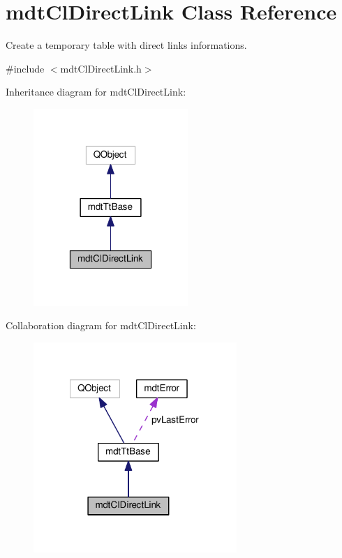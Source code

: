 \hypertarget{classmdt_cl_direct_link}{\section{mdt\-Cl\-Direct\-Link Class Reference}
\label{classmdt_cl_direct_link}
}


Create a temporary table with direct links informations.  




{\ttfamily \#include $<$mdt\-Cl\-Direct\-Link.\-h$>$}



Inheritance diagram for mdt\-Cl\-Direct\-Link\-:
\nopagebreak
\begin{figure}[H]
\begin{center}
\leavevmode
\includegraphics[width=166pt]{classmdt_cl_direct_link__inherit__graph}
\end{center}
\end{figure}


Collaboration diagram for mdt\-Cl\-Direct\-Link\-:
\nopagebreak
\begin{figure}[H]
\begin{center}
\leavevmode
\includegraphics[width=218pt]{classmdt_cl_direct_link__coll__graph}
\end{center}
\end{figure}
